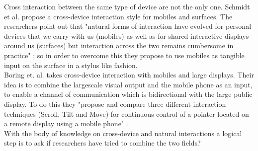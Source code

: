 Cross interaction between the same type of device are not the only one. Schmidt et al. propose a cross-device interaction style for mobiles and surfaces. The researchers point out that "natural forms of interaction have evolved for personal devices that we carry with us (mobiles) as well as for shared interactive displays around us (surfaces) but interaction across the two remains cumbersome in practice" \cite{Schmidt:2012}; so in order to overcome this they propose to use mobiles as tangible input on the surface in a stylus like fashion.\\
Boring et. al. takes cross-device interaction with mobiles and large displays. Their idea is to combine the largescale visual output and the mobile phone as an input, to enable a channel of communication which is bidirectional with the large public display. To do this they "propose and compare three different interaction techniques (Scroll, Tilt and Move) for continuous control of a pointer located on a remote display using a mobile phone" \cite{Boring:2009}.\\
With the body of knowledge on cross-device and natural interactions a logical step is to ask if researchers have tried to combine the two fields?
